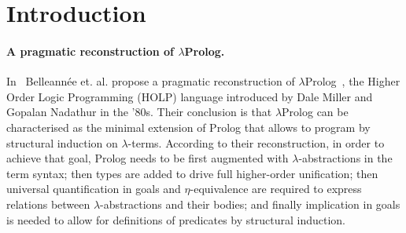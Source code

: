 \documentclass{easychair}
\begin{document}
\begin{abstract}


\end{abstract}

\section{Introduction}\label{sec:introduction}

\paragraph{A pragmatic reconstruction of $\lambda$Prolog.}

In~\cite{jlp98} Belleannée et. al. propose a pragmatic reconstruction
of $\lambda$Prolog~\cite{lambdap1,lambdap2,lambdap3}, the Higher Order
Logic Programming (HOLP) language introduced by Dale Miller and
Gopalan Nadathur in the '80s.
Their conclusion is that $\lambda$Prolog can be characterised as the
minimal extension of Prolog that allows to program by structural
induction on $\lambda$-terms. According to their reconstruction, in
order to achieve that goal, Prolog needs to be first augmented with
$\lambda$-abstractions in the term syntax; then types are added to
drive full higher-order unification; then universal quantification in
goals and $\eta$-equivalence are required to express relations between
$\lambda$-abstractions and their bodies; and finally implication in
goals is needed to allow for definitions of predicates by structural induction.
\end{document}
